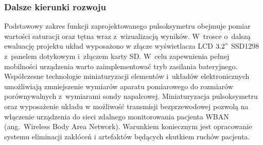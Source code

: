 \subsubsection{Dalsze kierunki rozwoju}
\label{subsubsec:Rozwoj}

Podstawowy zakres funkcji zaprojektowanego pulsoksymetru obejmuje pomiar wartości saturacji oraz tętna wraz z~wizualizacją wyników. 
W~trosce o~dalszą ewaluację projektu układ wyposażono w złącze wyświetlacza LCD $3.2"$ SSD1298 z~panelem dotykowym i~złączem karty SD. W~celu zapewnienia 
pełnej mobilności urządzenia warto zaimplementować tryb zasilania bateryjnego. Współczesne technologie miniaturyzacji elementów i~układów 
elektronicznych umożliwiają zmniejszenie wymiarów aparatu pomiarowego do rozmiarów porównywalnych z~wymiarami sondy napalcowej. Miniaturyzacja 
pulsoksymetru oraz wyposażenie układu w możliwość transmisji bezprzewodowej pozwolą na włączenie urządzenia do sieci zdalnego monitorowania 
pacjenta WBAN (ang.~Wireless Body Area Network). Warunkiem koniecznym jest opracowanie systemu eliminacji zakłóceń i artefaktów będących skutkiem
ruchów pacjenta.


